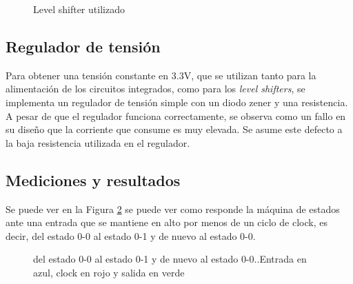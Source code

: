 \begin{figure}[H]
    \centering
    \caption{Level shifter utilizado}
    \label{fig:LEVEL_SHIFTER}
\end{figure}
\subsection{Regulador de tensi\'on}
Para obtener una tensi\'on constante en 3.3V, que se utilizan tanto  para la alimentaci\'on de los circuitos integrados, como para los \textit{level shifters}, se implementa un regulador de tensi\'on simple con un diodo zener y una resistencia.
A pesar de que el regulador funciona correctamente, se observa como un fallo en su dise\~no que la corriente que consume es muy elevada. Se asume este defecto a la baja resistencia utilizada en el regulador. 
\subsection{Mediciones y resultados}
Se puede ver en la Figura \ref{fig:GRAPH1} se puede ver como responde la m\'aquina de estados ante una entrada que se mantiene en alto por menos de un ciclo de clock, es decir, del estado 0-0 al estado 0-1 y de nuevo al estado 0-0.

\begin{figure}[H]
    \centering
    \caption{del estado 0-0 al estado 0-1 y de nuevo al estado 0-0..Entrada en azul, clock en rojo y salida en verde}
    \label{fig:GRAPH1}
\end{figure}


